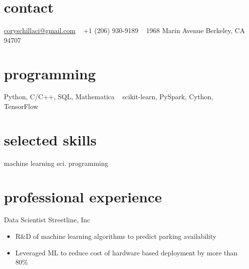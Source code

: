 \documentclass[]{friggeri-cv} %
\begin{document}


\begin{aside} %
\section{contact}
\href{mailto:coryschillaci@gmail.com}{coryschillaci@gmail.com}
~
+1 (206) 930-9189
~
1968 Marin Avenue
Berkeley, CA 94707
\section{programming}
Python, C/C++, SQL, Mathematica
~
scikit-learn, PySpark, Cython, TensorFlow
\section{selected skills}
machine learning
sci. programming
\end{aside}


\section{professional experience}
%
\begin{entrylist}
{Data Scientist}
{Streetline, Inc}
{\vspace{-\baselineskip}
\begin{itemize}
\item R\&D of machine learning algorithms to predict parking availability
\item Leveraged ML to reduce cost of hardware based deployment by more than 80\%
\end{itemize}
}
\end{entrylist}
\end{document}
